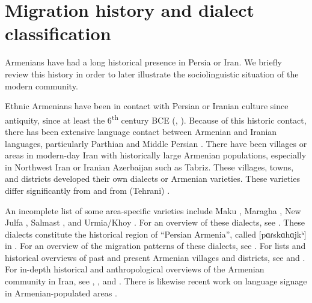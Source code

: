 \section{Migration history and dialect classification}\label{section: intro: migration}


Armenians have  had a long historical presence in Persia or Iran. We briefly review this history in order to later illustrate the   sociolinguistic situation of the modern community. 

Ethnic Armenians have been in contact with Persian or Iranian culture since antiquity, since at least the 6\textsuperscript{th} century BCE (\citealt[421]{Dekmejian-1997-ArmenianDiaspora}, \citealt[1]{Hovhannisian-2021-ArmenianCommunityPersianIranIntro}). Because of this historic contact, there has been extensive language contact between Armenian and Iranian languages, particularly Parthian and Middle Persian   \citep[\S1]{Meyer-2017-dissIranianArmenianContact5ThCentury}.  There have been villages or areas in modern-day Iran with historically large Armenian populations, especially in Northwest Iran or Iranian Azerbaijan such as Tabriz. These   villages,  towns, and districts developed their own dialects or Armenian varieties. These varieties   differ significantly from {\seaSEA} and from (Tehrani) {\iaIA}.  


An incomplete list of some   area-specific   varieties include  Maku \citep{Katvalyan-2018-Maku}, Maragha \citep{Adjarian-1926-MaraghaDialect},  New Julfa \citep{Adjarian-1940-NewJulfaDialect,Vaux-prep-NewJulfa}, Salmast \citep{Vaux-Salmast}, and Urmia/Khoy \citep{Asatryan-1962-KhoyUrmiaDialect}. For an overview of these dialects, see  \citet[85]{Martirosyan-2019-ArmenianDialectsBigVersionRussianJournal,Martirosyan-2019-Armeniandialects}.  These dialects constitute the historical region of ``Persian Armenia'', called [pɑɾskɑhɑjkʰ]  in {\seaSEA}  \citep{Martirosyan-prep-LinguCulturalPersianArmenian}.   For an overview of the migration patterns of these dialects, see \citet{HaykanushMesropian-Blog}.  For lists and historical overviews of  past and present Armenian villages and districts, see   \citet{EncyclopediaIranica-ModernArmeniansIran} and  \citet{Ghougassian-2021-ArmenianRuralSettlementNewJulfa}. For in-depth historical and anthropological overviews of the Armenian community in Iran, see \citet{Chaqueri-1998-ArmeniansIran},  \citet{sanasarian-2000-religiousMinoritiesIran},  and \citet{Barry-2017-ReGhettoArmenianTehran,barry-2018-armenianArmeniansIran}. There is likewise recent work on language signage in Armenian-populated areas \citep{RezaeiTadayyon-2018-LinguisticLandscapeIsfahanIranJulfa}.  

